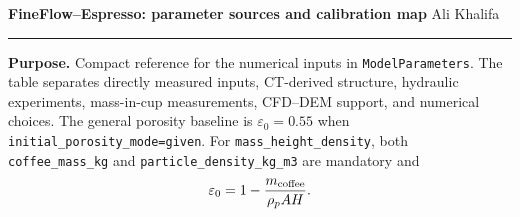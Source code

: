 \documentclass[a4paper,9pt]{article}
\begin{document}
\begin{landscape}

{\Large\bfseries FineFlow--Espresso: parameter sources and calibration map}\hfill
{\small Ali Khalifa}\par
\vspace{1mm}
\textcolor{tumblue}{\rule{\linewidth}{0.6pt}}
\vspace{1mm}

{\footnotesize
\textbf{Purpose.} Compact reference for the numerical inputs in \texttt{ModelParameters}. The table separates directly measured inputs, CT-derived structure, hydraulic experiments, mass-in-cup measurements, CFD--DEM support, and numerical choices. The general porosity baseline is $\varepsilon_0=0.55$ when \texttt{initial\_porosity\_mode=given}. For \texttt{mass\_height\_density}, both \texttt{coffee\_mass\_kg} and \texttt{particle\_density\_kg\_m3} are mandatory and
\[
\varepsilon_0=1-\frac{m_{\rm coffee}}{\rho_p A H}.
\]
}


\end{landscape}
\end{document}
